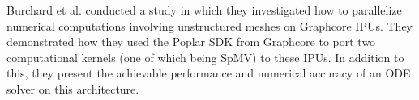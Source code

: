 

Burchard et al. \cite{10.3389/fphy.2023.979699} conducted a study in which they investigated how to parallelize numerical computations involving unstructured meshes on Graphcore IPUs. They demonstrated how they used the Poplar SDK from Graphcore to port two computational kernels (one of which being SpMV) to these IPUs. In addition to this, they present the achievable performance and numerical accuracy of an ODE solver on this architecture.
\medskip








